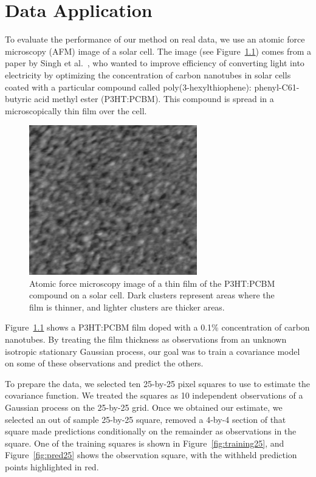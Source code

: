 \chapter{Data Application} \label{chapter4:Data-Application}

To evaluate the performance of our method on real data, we use an atomic force microscopy (AFM) image of a solar cell. The image (see Figure~\ref{fig:film}) comes from a paper by Singh et al.~\cite{Singh2014}, who wanted to improve efficiency of converting light into electricity by optimizing the concentration of carbon nanotubes in solar cells coated with a particular compound called poly(3-hexylthiophene): phenyl-C61-butyric acid methyl ester (P3HT:PCBM). This compound is spread in a microscopically thin film over the cell.

\begin{figure}[htbp]
	\centering
	\includegraphics[width=0.65\textwidth]{film.png}
	\caption{Atomic force microscopy image of a thin film of the P3HT:PCBM compound on a solar cell. Dark clusters represent areas where the film is thinner, and lighter clusters are thicker areas.}
	\label{fig:film}
\end{figure}

Figure~\ref{fig:film} shows a P3HT:PCBM film doped with a 0.1\% concentration of carbon nanotubes. By treating the film thickness as observations from an unknown isotropic stationary Gaussian process, our goal was to train a covariance model on some of these observations and predict the others.

To prepare the data, we selected ten 25-by-25 pixel squares to use to estimate the covariance function. We treated the squares as 10 independent observations of a Gaussian process on the 25-by-25 grid. Once we obtained our estimate, we selected an out of sample 25-by-25 square, removed a 4-by-4 section of that square made predictions conditionally on the remainder as observations in the square. One of the training squares is shown in Figure~\ref{fig:training25}, and Figure~\ref{fig:pred25} shows the observation square, with the withheld prediction points highlighted in red.

